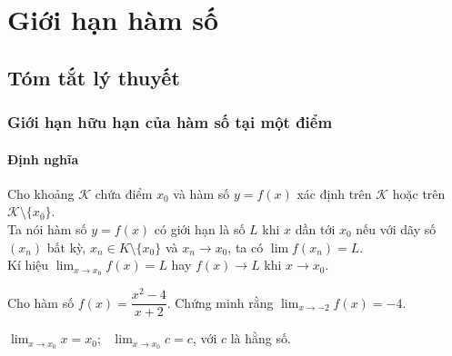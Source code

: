 \section{Giới hạn hàm số}
\subsection{Tóm tắt lý thuyết}
\subsubsection{Giới hạn hữu hạn của hàm số tại một điểm}
\paragraph{Định nghĩa}
\begin{dn}
Cho khoảng $\mathscr{K}$ chứa điểm $x_0$ và hàm số $y=f(x)$ xác định trên $\mathscr{K}$ hoặc trên $\mathscr{K}\setminus \{x_0\}$.\\
Ta nói hàm số $y = f(x)$ có giới hạn là số $L$ khi $x$ dần tới $x_0$ nếu với dãy số $(x_n)$ bất kỳ, $x_n\in K\setminus \{x_0\}$ và $x_n\to x_0$, ta có $\displaystyle\lim f(x_n)=L$.\\
Kí hiệu $\displaystyle\lim_{x\to x_0} f(x)=L$ hay $f(x)\rightarrow L$ khi $x \rightarrow x_0$.
\end{dn}
\begin{vd}%
Cho hàm số $f(x) = \dfrac{x^2 - 4}{x + 2}$. Chứng minh rằng $\displaystyle\lim_{x\to -2} f(x)= -4$.
\end{vd}
\begin{note}
$\displaystyle \lim_{x \to x_0}x = x_0; \text{ }\displaystyle \lim_{x \to x_0} c = c$, với $c$ là hằng số. 
\end{note}
